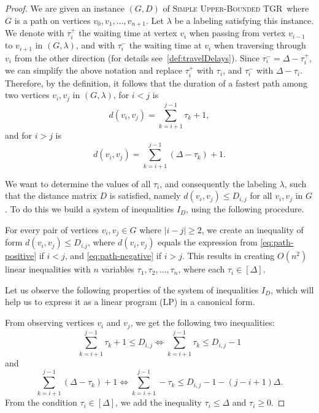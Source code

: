\documentclass[a4paper,UKenglish,cleveref, autoref, thm-restate]{lipics-v2021}
\newcommand{\deltaUpperBound}{\textsc{Simple Upper-Bounded TGR}}
\begin{document}
\begin{proof}
We are given an instance  $(G,D)$ of \deltaUpperBound\, where $G$ is a path on vertices $v_0, v_1, \dots, v_{n+1}$. 
Let $\lambda$ be a labeling satisfying this instance.
We denote with $\tau_i^+$ the waiting time at vertex $v_i$ when passing from vertex $v_{i-1}$ to $v_{i+1}$ in $(G,\lambda)$,
and with $\tau_i^-$ the waiting time at $v_i$ when traversing through $v_i$ from the other direction (for details see~\cref{def:travelDelays}).
Since $\tau_i^- = \Delta - \tau_i^+$, we can simplify the above notation and replace $\tau_i^+$ with $\tau_i$, and $\tau_i^-$ with $ \Delta - \tau_i$.
Therefore, by the definition, it follows that the duration of a fastest path among two vertices $v_i, v_j$ in $(G,\lambda)$, for $i < j$
is 
\begin{equation}\label{eq:path-positive}
    d(v_i,v_j)=\sum_{k = i+1}^{j-1} \tau_k + 1,
\end{equation}
and for $i > j$ is 
\begin{equation}\label{eq:path-negative}
d(v_i,v_j)=\sum_{k = i+1}^{j-1} (\Delta - \tau_k) + 1.
\end{equation}

We want to determine the values of all $\tau_i$, and consequently the labeling $\lambda$, such that the distance matrix $D$ is satisfied,
namely $d(v_i,v_j) \leq D_{i,j}$ for all $v_i,v_j$ in $G$.
To do this we build a system of inequalities $I_D$, using the following procedure.

For every pair of vertices $v_i, v_j \in G$ where $|i-j| \geq 2$, we create an inequality of form $d(v_i,v_j) \leq D_{i.j}$, where $d(v_i,v_j)$ equals the expression from \cref{eq:path-positive} if $i < j$, and \cref{eq:path-negative} if $i > j$.
This results in creating $O(n^2)$ linear inequalities with $n$ variables $\tau_1,\tau_2, \dots, \tau_n$,
where each $\tau_i \in [\Delta]$. 

Let us observe the following properties of the system of inequalities $I_D$, which will help us to express it as a linear program (LP) in a canonical form.

From observing vertices $v_i$ and $v_j$, we get the following two inequalities:
\begin{equation}
\sum_{k = i+1}^{j-1} \tau_k + 1 \leq D_{i,j}
\Leftrightarrow
\sum_{k = i+1}^{j-1} \tau_k \leq D_{i,j} - 1
\end{equation}
and
\begin{equation}
\sum_{k = i+1}^{j-1} (\Delta - \tau_k) + 1
\Leftrightarrow
\sum_{k = i+1}^{j-1} - \tau_k \leq  D_{i,j} - 1 -(j-i+1)\Delta .
\end{equation}
From the condition $\tau_i \in [\Delta]$, we add the inequality $\tau_i \leq \Delta$ and $\tau_i \geq 0$.


\end{proof}
\end{document}
